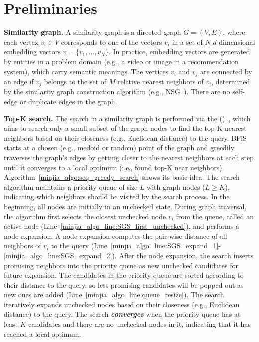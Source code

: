 \vspace{-1em}
\section{Preliminaries}
\label{minjia_sec:preliminaries}

\noindent
\textbf{Similarity graph.} A similarity graph is a directed graph $G=(V, E)$, where each vertex $v_i \in V$ corresponds to one of the vectors $v_i$ in a set of $N$ $d$-dimensional embedding vectors $v=\{v_1,...,v_N\}$. In practice, embedding vectors are generated by entities in a problem domain (e.g., a video or image in a recommendation system), which carry semantic meanings. The vertices $v_i$ and $v_j$ are connected by an edge if $v_j$ belongs to the set of $M$ relative nearest neighbors of $v_i$, determined by the similarity graph construction algorithm (e.g., NSG~\cite{fu2019fast}). There are no self-edge or duplicate edges in the graph. 

\noindent
\textbf{Top-K search.} The search in a similarity graph is performed via the \SeqFullName (\SeqShortName)~\cite{fu2019fast}, which aims to search only a small subset of the graph nodes to find the top-K nearest neighbors based on their closeness (e.g., Euclidean distance) to the query. BFiS starts at a chosen (e.g., medoid or random) point of the graph and greedily traverses the graph's edges by getting closer to the nearest neighbors at each step until it converges to a local optimum  (i.e., found top-K near neighbors). Algorithm~\ref{minjia_algo:seq_greedy_search} shows its basic idea. The search algorithm maintains a priority queue of size $L$ with graph nodes ($L \ge K$), indicating which neighbors should be visited by the search process. In the beginning, all nodes are initially in an unchecked state. During graph traversal, the algorithm first selects the closest unchecked node $v_i$ from the queue, called an active node (Line~\ref{minjia_algo_line:SGS_first_unchecked}), and performs a node expansion. A node expansion computes the pair-wise distance of all neighbors of $v_i$ to the query (Line~\ref{minjia_algo_line:SGS_expand_1}-\ref{minjia_algo_line:SGS_expand_2}). After the node expansion, the search inserts promising neighbors into the priority queue as new unchecked candidates for future expansion. The candidates in the priority queue are sorted according to their distance to the query, so less promising candidates will be popped out as new ones are added (Line~\ref{minjia_algo_line:queue_resize}). The search iteratively expands unchecked nodes based on their closeness (e.g., Euclidean distance) to the query. The search \textbf{\emph{converges}} when the priority queue has at least $K$ candidates and there are no unchecked nodes in it, indicating that it has reached a local optimum. 

